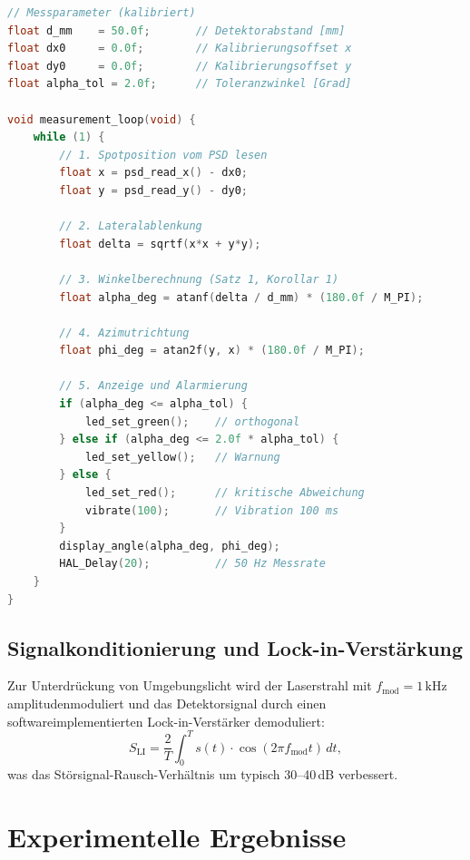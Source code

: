 ﻿\documentclass[a4paper,12pt]{article}
\theoremstyle{definition}
\begin{document}
\begin{lstlisting}[language=C, caption=Pseudocode des Echtzeit-Messzyklus auf dem STM32]
// Messparameter (kalibriert)
float d_mm    = 50.0f;       // Detektorabstand [mm]
float dx0     = 0.0f;        // Kalibrierungsoffset x
float dy0     = 0.0f;        // Kalibrierungsoffset y
float alpha_tol = 2.0f;      // Toleranzwinkel [Grad]

void measurement_loop(void) {
    while (1) {
        // 1. Spotposition vom PSD lesen
        float x = psd_read_x() - dx0;
        float y = psd_read_y() - dy0;

        // 2. Lateralablenkung
        float delta = sqrtf(x*x + y*y);

        // 3. Winkelberechnung (Satz 1, Korollar 1)
        float alpha_deg = atanf(delta / d_mm) * (180.0f / M_PI);

        // 4. Azimutrichtung
        float phi_deg = atan2f(y, x) * (180.0f / M_PI);

        // 5. Anzeige und Alarmierung
        if (alpha_deg <= alpha_tol) {
            led_set_green();    // orthogonal
        } else if (alpha_deg <= 2.0f * alpha_tol) {
            led_set_yellow();   // Warnung
        } else {
            led_set_red();      // kritische Abweichung
            vibrate(100);       // Vibration 100 ms
        }
        display_angle(alpha_deg, phi_deg);
        HAL_Delay(20);          // 50 Hz Messrate
    }
}
\end{lstlisting}

\subsection{Signalkonditionierung und Lock-in-Verstärkung}

Zur Unterdrückung von Umgebungslicht wird der Laserstrahl mit
$f_{\mathrm{mod}} = 1\,\mathrm{kHz}$ amplitudenmoduliert und das Detektorsignal
durch einen softwareimplementierten Lock-in-Verstärker demoduliert:
\[
  S_{\mathrm{LI}} = \frac{2}{T} \int_0^T s(t) \cdot \cos(2\pi f_{\mathrm{mod}} t)\, dt,
\]
was das Störsignal-Rausch-Verhältnis um typisch 30--40\,dB verbessert.

\section{Experimentelle Ergebnisse}
\end{document}
